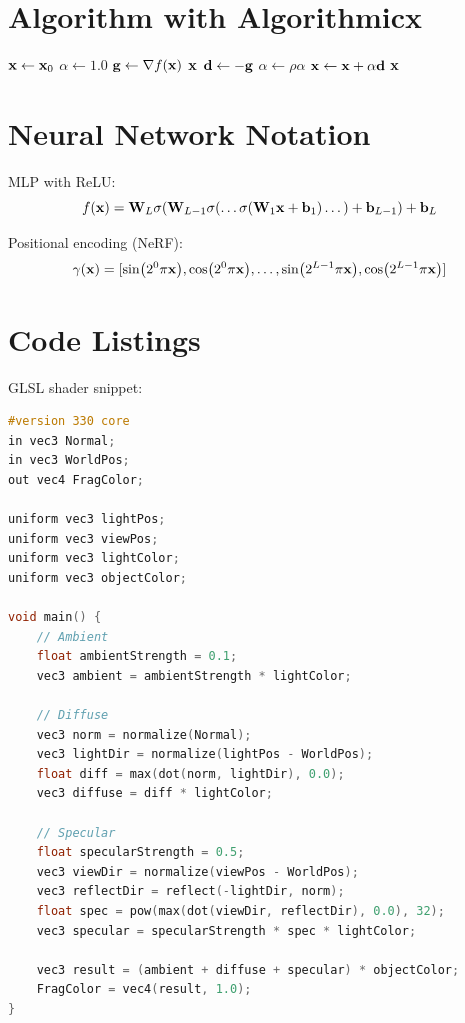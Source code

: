 \documentclass[12pt,a4paper]{article}
\begin{document}
\section{Algorithm with Algorithmicx}\label{sec:algorithmicx}
\begin{algorithm}[htbp]
\caption{Gradient Descent with Line Search}\label{alg:linesearch}
\begin{algorithmic}[1]
\State $\vb{x} \gets \vb{x}_0$
\State $\alpha \gets 1.0$
    \State $\vb{g} \gets \nabla f(\vb{x})$
        \State \Return $\vb{x}$
    \EndIf
    \State $\vb{d} \gets -\vb{g}$
        \State $\alpha \gets \rho \alpha$ 
    \EndWhile
    \State $\vb{x} \gets \vb{x} + \alpha \vb{d}$
\EndFor
\State \Return $\vb{x}$
\end{algorithmic}
\end{algorithm}

\section{Neural Network Notation}\label{sec:nn}
MLP with ReLU:
\begin{equation}
f(\vb{x}) = \vb{W}_L \sigma(\vb{W}_{L-1} \sigma(\dots \sigma(\vb{W}_1 \vb{x} + \vb{b}_1) \dots) + \vb{b}_{L-1}) + \vb{b}_L
\end{equation}

Positional encoding (NeRF):
\begin{equation}
\gamma(\vb{x}) = [\sin(2^0 \pi \vb{x}), \cos(2^0 \pi \vb{x}), \dots, \sin(2^{L-1} \pi \vb{x}), \cos(2^{L-1} \pi \vb{x})]
\end{equation}

\section{Code Listings}\label{sec:listings}
GLSL shader snippet:
\begin{lstlisting}[language=C, caption=GLSL fragment shader, label=lst:glsl]
#version 330 core
in vec3 Normal;
in vec3 WorldPos;
out vec4 FragColor;

uniform vec3 lightPos;
uniform vec3 viewPos;
uniform vec3 lightColor;
uniform vec3 objectColor;

void main() {
    // Ambient
    float ambientStrength = 0.1;
    vec3 ambient = ambientStrength * lightColor;

    // Diffuse
    vec3 norm = normalize(Normal);
    vec3 lightDir = normalize(lightPos - WorldPos);
    float diff = max(dot(norm, lightDir), 0.0);
    vec3 diffuse = diff * lightColor;

    // Specular
    float specularStrength = 0.5;
    vec3 viewDir = normalize(viewPos - WorldPos);
    vec3 reflectDir = reflect(-lightDir, norm);
    float spec = pow(max(dot(viewDir, reflectDir), 0.0), 32);
    vec3 specular = specularStrength * spec * lightColor;

    vec3 result = (ambient + diffuse + specular) * objectColor;
    FragColor = vec4(result, 1.0);
}
\end{lstlisting}
\end{document}
